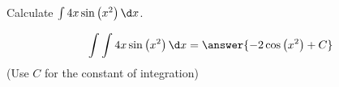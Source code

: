 \documentclass{ximera}
\author{Jim Talamo}
\begin{document}
\begin{exercise}
Calculate $\int 4x \sin\left(x^2\right) \d x $.


\[
\int \int 4x \sin\left(x^2\right) \d x = \answer{ -2\cos\left(x^2\right)  + C } 
\]
(Use $C$ for the constant of integration)

\end{exercise}
\end{document}
